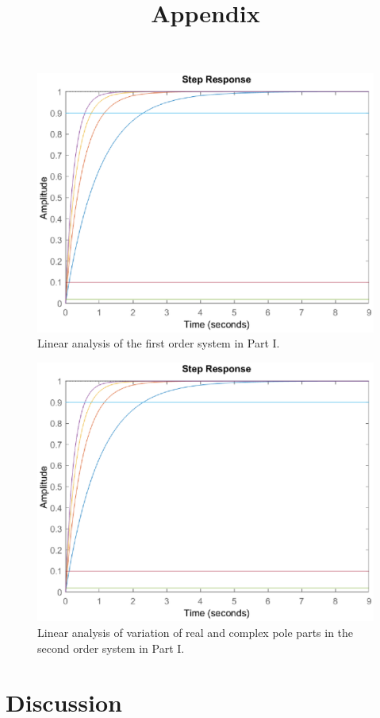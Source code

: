 \documentclass[11pt]{article}
\begin{document}
\begin{figure}
    \centering
    \includegraphics[width=0.75\linewidth]{lab0405/fig/lti-0101-first_order.eps}
    \caption{Linear analysis of the first order system in Part I.}
    \label{fig:lti part 01 first order}
\end{figure}

\begin{figure}
    \centering
    \includegraphics[width=0.75\linewidth]{lab0405/fig/lti-0101-first_order.eps}
    \caption{Linear analysis of variation of real and complex pole parts in the second order system in Part I.}
    \label{fig:lti part 01 real}
\end{figure}



\section{Discussion}

\newpage
\appendix
\title{Appendix}\label{doc:apx}
\maketitle
\end{document}

